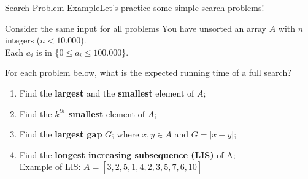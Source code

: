\begin{frame}{Search Problem Example}{Let's practice some simple search problems!}

  \begin{block}{Consider the same input for all problems}
    You have unsorted an array $A$ with $n$ integers ($n < 10.000$).\\
    Each $a_i$ is in \{$0 \leq a_i \leq 100.000$\}.
  \end{block}\bigskip

  For each problem below, what is the expected running time of a full search?
  \begin{enumerate}
  \item Find the {\bf largest} and the {\bf smallest} element of $A$;
  \item Find the {\bf $k^{th}$ smallest} element of $A$;
  \item Find the {\bf largest gap} $G$; where $x,y \in A$ and $G = |x-y|$;
  \item Find the {\bf longest increasing subsequence (LIS)} of A;\\
    \hfill Example of LIS: $A = [3,2,5,\overline1,4,\overline{2, 3, 5},7,\overline{6,10}]$
  \end{enumerate}
\end{frame}

